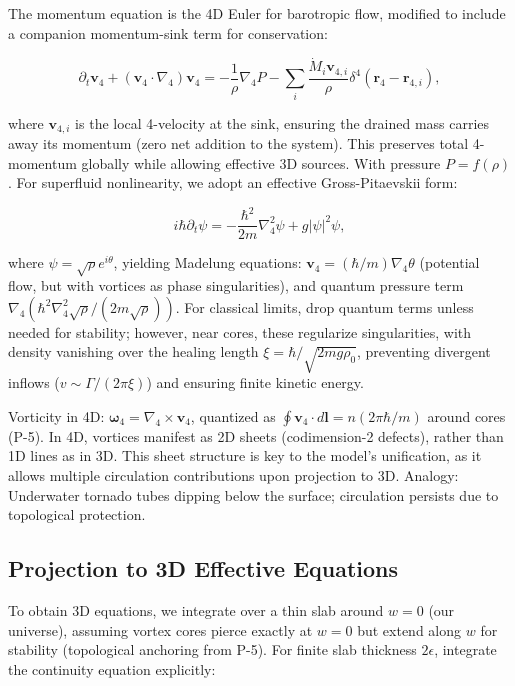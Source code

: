 \documentclass{article}
\begin{document}
The momentum equation is the 4D Euler for barotropic flow, modified to include a companion momentum-sink term for conservation:

\[
\partial_t \mathbf{v}_4 + (\mathbf{v}_4 \cdot \nabla_4) \mathbf{v}_4 = -\frac{1}{\rho} \nabla_4 P - \sum_i \frac{\dot{M}_i \mathbf{v}_{4,i}}{\rho} \delta^4(\mathbf{r}_4 - \mathbf{r}_{4,i}),
\]

where $\mathbf{v}_{4,i}$ is the local 4-velocity at the sink, ensuring the drained mass carries away its momentum (zero net addition to the system). This preserves total 4-momentum globally while allowing effective 3D sources. With pressure $P = f(\rho)$. For superfluid nonlinearity, we adopt an effective Gross-Pitaevskii form:

\[
i \hbar \partial_t \psi = -\frac{\hbar^2}{2 m} \nabla_4^2 \psi + g |\psi|^2 \psi,
\]

where $\psi = \sqrt{\rho} e^{i \theta}$, yielding Madelung equations: $\mathbf{v}_4 = (\hbar / m) \nabla_4 \theta$ (potential flow, but with vortices as phase singularities), and quantum pressure term $\nabla_4 (\hbar^2 \nabla_4^2 \sqrt{\rho} / (2 m \sqrt{\rho}))$. For classical limits, drop quantum terms unless needed for stability; however, near cores, these regularize singularities, with density vanishing over the healing length $\xi = \hbar / \sqrt{2 m g \rho_0}$, preventing divergent inflows ($v \sim \Gamma / (2\pi \xi)$) and ensuring finite kinetic energy.

Vorticity in 4D: $\boldsymbol{\omega}_4 = \nabla_4 \times \mathbf{v}_4$, quantized as $\oint \mathbf{v}_4 \cdot d\mathbf{l} = n (2\pi \hbar / m)$ around cores (P-5). In 4D, vortices manifest as 2D sheets (codimension-2 defects), rather than 1D lines as in 3D. This sheet structure is key to the model's unification, as it allows multiple circulation contributions upon projection to 3D. Analogy: Underwater tornado tubes dipping below the surface; circulation persists due to topological protection.


\subsection{Projection to 3D Effective Equations}

To obtain 3D equations, we integrate over a thin slab around $w=0$ (our universe), assuming vortex cores pierce exactly at $w=0$ but extend along $w$ for stability (topological anchoring from P-5). For finite slab thickness $2\epsilon$, integrate the continuity equation explicitly:
\end{document}
